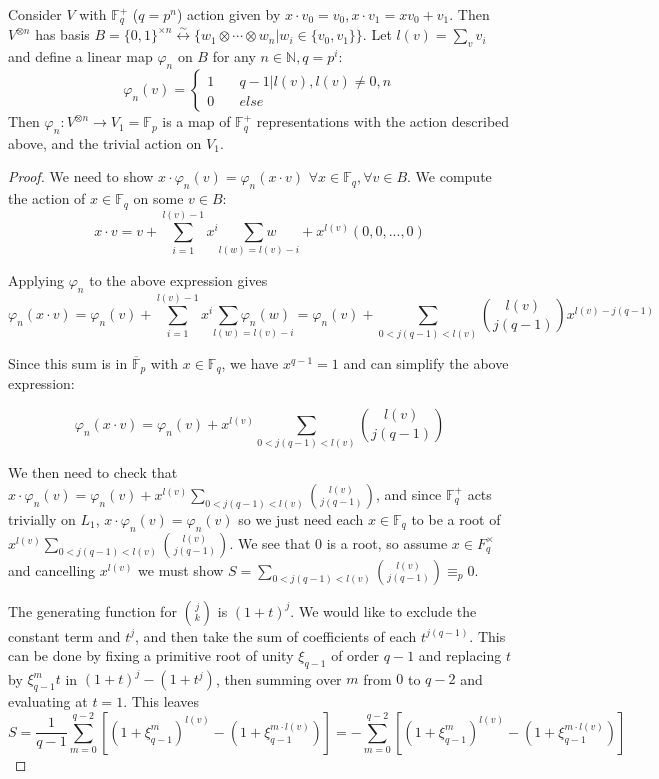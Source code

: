 \documentclass[11pt]{article} %
\begin{document}
\begin{prop} Consider $V$ with $\mathbb{F}_q^{+}$ ($q=p^n$) action given by $x\cdot v_0 = v_0,x \cdot v_1 = xv_0 + v_1$. Then $V^{\otimes{n}}$ has basis $B =\{0,1\}^{\times n}\overset{\sim}{\longleftrightarrow} \{w_1 \otimes \cdots \otimes w_n | w_i \in \{v_0,v_1\}\}$. Let $l(v) = \sum_v{v_i}$ and define a linear map $\varphi_n$ on $B$ for any $n \in \mathbb{N}, q = p^i$:
$$
\varphi_n(v) = \left\{
        \begin{array}{ll}
            1 & \quad q-1| l(v), l(v) \neq 0,n \\
            0 & \quad else
        \end{array}
    \right.
$$
\noindent Then $ \varphi_n: V^{\otimes n} \rightarrow V_1=\mathbb{F}_p$ is a map of $\mathbb{F}_q^{+}$ representations with the action described above, and the trivial action on $V_1$.
\begin{proof}
We need to show $x \cdot \varphi_n(v) = \varphi_n(x \cdot v)$ $\forall x \in \mathbb{F}_q, \forall v \in B$. We compute the action of $x \in \mathbb{F}_q$ on some $v \in B$:
$$
x \cdot v = v +  \underset{i=1}{\sum^{l(v) - 1}}{x^i}\underset{l(w) = l(v)-i}{\sum{w}} + x^{l(v)}(0,0,...,0)
$$

\noindent Applying $\varphi_n$ to the above expression gives
$$
\varphi_n(x\cdot v) = \varphi_n(v) + \underset{i=1}{\sum^{l(v) - 1}}{x^i}\underset{l(w) = l(v)-i}{\sum{\varphi_n(w)}}
= \varphi_n(v) + \sum_{0 < j(q-1) < l(v)}{{l(v)}\choose{j(q-1)}}x^{l(v)-j(q-1)}
$$

\noindent Since this sum is in $\overline{\mathbb{F}}_p$ with $x \in \mathbb{F}_q$, we have $x^{q-1} = 1$ and can simplify the above expression:

$$
\varphi_n(x\cdot v) = \varphi_n(v) + x^{l(v)}\sum_{0 < j(q-1) < l(v)}{{l(v)}\choose{j(q-1)}}
$$

We then need to check that $x \cdot \varphi_n(v) = \varphi_n(v) + x^{l(v)}\sum_{0 < j(q-1) < l(v)}{{l(v)}\choose{j(q-1)}}$, and since $\mathbb{F}_q^+$ acts trivially on $L_1$, $x\cdot \varphi_n(v) = \varphi_n(v)$ so we just need each $x \in \mathbb{F}_q$ to be a root of $x^{l(v)}\sum_{0 < j(q-1) < l(v)}{{l(v)}\choose{j(q-1)}}$. We see that $0$ is a root, so assume $x \in F_q^{\times}$ and cancelling $x^{l(v)}$ we must show $S = \sum_{0 < j(q-1) < l(v)}{{l(v)}\choose{j(q-1)}} \equiv_p 0$.

The generating function for ${j}\choose{k}$ is $(1 + t)^j$. We would like to exclude the constant term and $t^j$, and then take the sum of coefficients of each $t^{j(q-1)}$. This can be done by fixing a primitive root of unity $\xi_{q-1}$ of order $q-1$ and replacing $t$ by $\xi_{q-1}^mt$ in $(1+t)^j-(1+t^j)$, then summing over $m$ from $0$ to $q-2$ and evaluating at $t=1$. This leaves
$$
S = \frac{1}{q-1} \sum_{m=0}^{q-2}[(1 + \xi_{q-1}^m)^{l(v)}-(1 +  \xi_{q-1}^{m\cdot l(v)})] =  - \sum_{m=0}^{q-2}[(1 + \xi_{q-1}^m)^{l(v)}-(1 +  \xi_{q-1}^{m\cdot l(v)})]
$$


\end{proof}
\end{prop}
\end{document}
